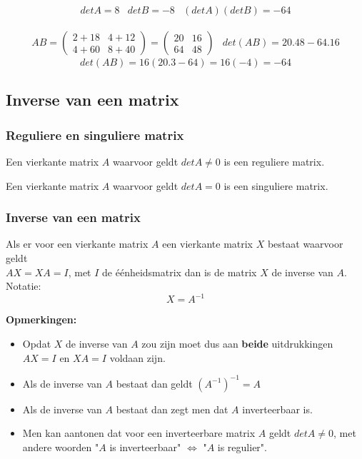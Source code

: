 \begin{itemize}
	\[ \begin{array}{lll} det A = 8 & det B = -8 & (det A)(det B)=-64 \end{array} \]
	
	\[ \begin{array}{ll} AB=\left( \begin{matrix}
	2+18 & 4+12 \\ 4+60 & 8+40 
	\end{matrix} \right)=\left( \begin{matrix}
	20 & 16 \\ 64 & 48 
	\end{matrix} \right) & det(AB)=20.48-64.16 \end{array} \]
	\[ det(AB)=16(20.3-64)=16(-4)=-64 \]
	
\end{itemize}

\subsection{Inverse van een matrix}

\subsubsection{Reguliere en singuliere matrix}

Een vierkante matrix $A$ waarvoor geldt $det A \neq 0$ is een reguliere matrix.

Een vierkante matrix $A$ waarvoor geldt $det A =0$ is een singuliere matrix.

\subsubsection{Inverse van een matrix}

Als er voor een vierkante matrix $A$ een vierkante matrix $X$ bestaat waarvoor geldt\\ $AX=XA=I$, met $I$ de \'{e}\'{e}nheidsmatrix dan is de matrix $X$ de inverse van $A$.\\
Notatie:
\[ X=A^{-1} \]

{\bf Opmerkingen:} 
\begin{itemize}
	\item Opdat $X$ de inverse van $A$ zou zijn moet dus aan {\bf beide} uitdrukkingen $AX=I$ en $XA=I$ voldaan zijn.
	\item Als de inverse van $A$ bestaat dan geldt $(A^{-1})^{-1}=A$
	\item Als de inverse van $A$ bestaat dan zegt men dat $A$ inverteerbaar is.
	\item Men kan aantonen dat voor een inverteerbare matrix $A$ geldt $det A \neq 0$, met andere woorden "$A$ is inverteerbaar" $\Leftrightarrow$ "$A$ is regulier". 
\end{itemize}

